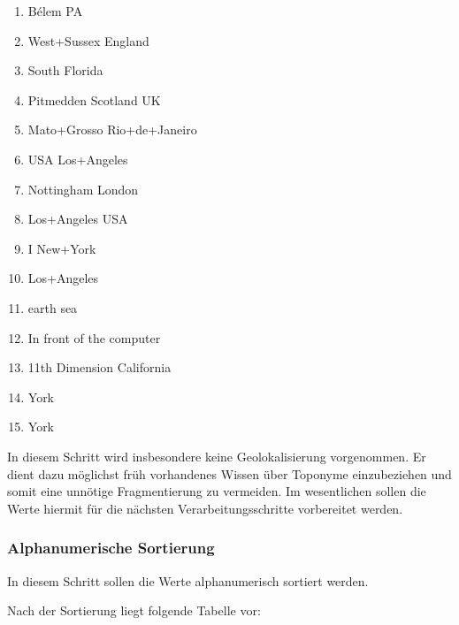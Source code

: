 				\begin{multicols}{2}
					\begin{enumerate}
						\item Bélem PA
						\item West+Sussex England
						\item South Florida
						\item Pitmedden Scotland UK
						\item Mato+Grosso Rio+de+Janeiro
						\item USA Los+Angeles
						\item Nottingham London
						\item Los+Angeles USA
						\item I New+York 
						\item Los+Angeles
						\item earth sea
						\item In front of the computer
						\item 11th Dimension California
						\item York
						\item York
					\end{enumerate}
				\end{multicols}

				In diesem Schritt wird insbesondere keine Geolokalisierung vorgenommen. 
				Er dient dazu möglichst früh vorhandenes Wissen über Toponyme einzubeziehen und somit eine unnötige Fragmentierung zu vermeiden.
				Im wesentlichen sollen die Werte hiermit für die nächsten Verarbeitungsschritte vorbereitet werden.

			\subsubsection{Alphanumerische Sortierung}

				In diesem Schritt sollen die Werte alphanumerisch sortiert werden. 

				Nach der Sortierung liegt folgende Tabelle vor:

